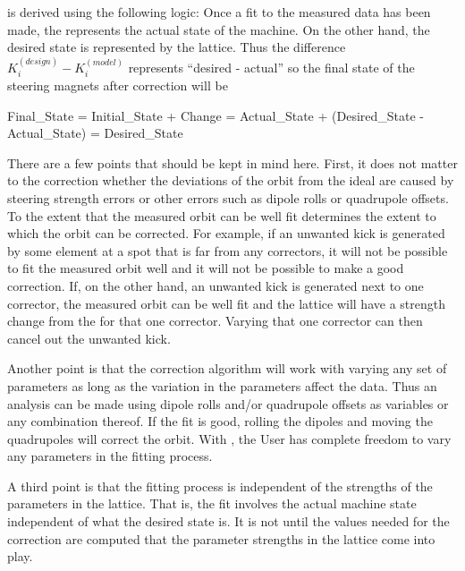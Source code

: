 \documentclass{hitec}     %
\begin{document}
{ is derived using the following logic: Once a fit to the measured data has been made, the
 represents the actual state of the machine. On the other hand, the desired state is
represented by the  lattice. Thus the difference $K_{i}^{(design)} - K_{i}^{(model)}$
represents ``desired - actual'' so the final state of the steering magnets after correction will be
\begin{code}
  Final_State = Initial_State + Change
              = Actual_State + (Desired_State - Actual_State)
              = Desired_State
\end{code}
There are a few points that should be kept in mind here. First, it does not matter to the
correction whether the deviations of the orbit from the ideal are caused by steering strength errors
or other errors such as dipole rolls or quadrupole offsets. To the extent that the measured orbit
can be well fit determines the extent to which the orbit can be corrected. For example, if an unwanted
kick is generated by some element at a spot that is far from any correctors, it will not be possible
to fit the measured orbit well and it will not be possible to make a good correction. If, on the
other hand, an unwanted kick is generated next to one corrector, the measured orbit can be well fit
and the  lattice will have a strength change from the  for that one
corrector. Varying that one corrector can then cancel out the unwanted kick.

Another point is that the correction algorithm will work with varying any set of parameters as long
as the variation in the parameters affect the  data. Thus an analysis can be made using
dipole rolls and/or quadrupole offsets as variables or any combination thereof. If the fit is good,
rolling the dipoles and moving the quadrupoles will correct the orbit. With \tao, the User has
complete freedom to vary any parameters in the fitting process.

A third point is that the fitting process is independent of the strengths of the parameters in the
 lattice. That is, the fit involves the actual machine state independent of what the
desired state is. It is not until the values needed for the correction are computed that the
parameter strengths in the  lattice come into play. 

}
\end{document}

